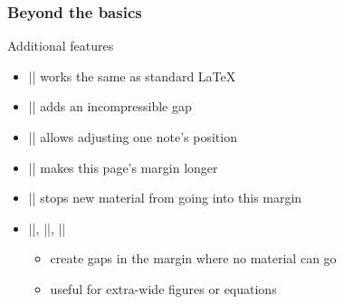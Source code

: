 \documentclass{beamer}
\begin{document}
\begin{frame}
{    %
    \hfill
  }
\end{frame}

\begin{frame}[fragile]
  \frametitle{Beyond the basics}
  \begin{block}{Additional features}
    \begin{itemize}
    \item |\marginparpush| works the same as standard \LaTeX
    \item || adds an incompressible gap
    \item || allows adjusting one note's position
    \item || makes this page's margin longer
    \item |\clearmargin| stops new material from going into this margin
    \item |\blockmargin|, |\unblockmargin|, ||
      \vskip-0.3pc
      \begin{itemize}
      \item create gaps in the margin where no material can go
      \item useful for extra-wide figures or equations
      \end{itemize}
    \end{itemize}
  \end{block}
\end{frame}
\end{document}
